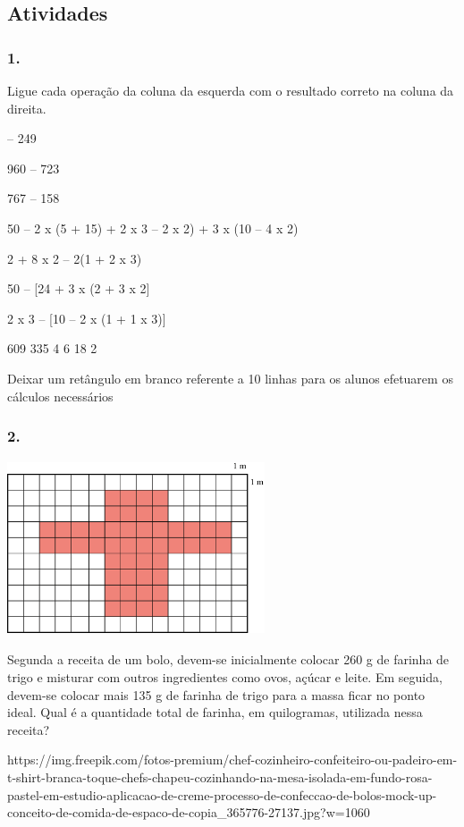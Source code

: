 \begin{enumerate}
\subsection{Atividades}\label{atividades-1}

\subsubsection{1.}\label{section-13}

Ligue cada operação da coluna da esquerda com o resultado correto na
coluna da direita.

 -- 249

960 -- 723

767 -- 158

50 -- 2 x (5 + 15) + 2 x 3 -- 2 x 2) + 3 x (10 -- 4 x 2)

2 + 8 x 2 -- 2(1 + 2 x 3)

50 -- {[}24 + 3 x (2 + 3 x 2{]}

2 x 3 -- {[}10 -- 2 x (1 + 1 x 3){]}

609
335
4
6
18
2

Deixar um retângulo em branco referente a 10 linhas para os alunos
efetuarem os cálculos necessários

\subsubsection{2.}\label{section-14}

\includegraphics[width=3.00000in,height=2.02528in]{media/image32.png}

Segunda a receita de um bolo, devem-se inicialmente colocar 260 g de farinha
de trigo e misturar com outros ingredientes como ovos, açúcar e leite.
Em seguida, devem-se colocar mais 135 g de farinha de trigo para a massa
ficar no ponto ideal. Qual é a quantidade total de farinha, em quilogramas,
utilizada nessa receita?

https://img.freepik.com/fotos-premium/chef-cozinheiro-confeiteiro-ou-padeiro-em-t-shirt-branca-toque-chefs-chapeu-cozinhando-na-mesa-isolada-em-fundo-rosa-pastel-em-estudio-aplicacao-de-creme-processo-de-confeccao-de-bolos-mock-up-conceito-de-comida-de-espaco-de-copia\_365776-27137.jpg?w=1060


\end{enumerate}

